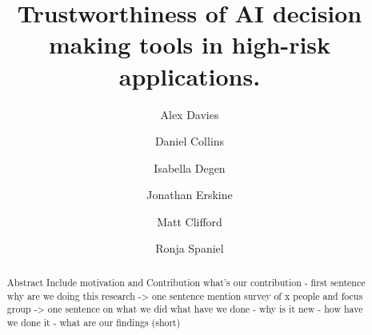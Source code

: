 \documentclass[manuscript,screen,review]{acmart}
\begin{document}
\title{Trustworthiness of AI decision making tools in high-risk applications.}

\author{Alex Davies}
\author{Daniel Collins}
\author{Isabella Degen}
\author{Jonathan Erskine}
\author{Matt Clifford}
\author{Ronja Spaniel}

\renewcommand{\shortauthors}{Team Eagle Lazer Fang, et al.}

\begin{abstract}
Abstract
 Include motivation and Contribution
 what's our contribution - first sentence
 why are we doing this research -> one sentence
 mention survey of x people and focus group -> one sentence on what we did
 what have we done - why is it new - how have we done it - what are our findings (short)
 
 
 
\end{abstract}
\end{document}
